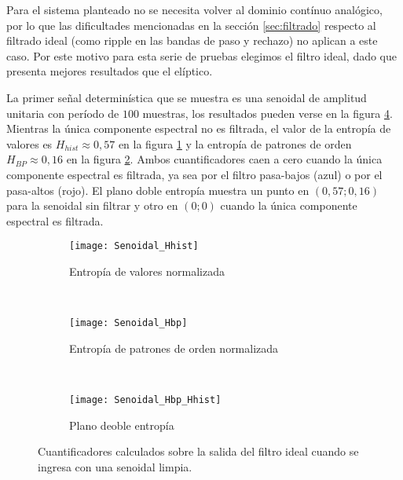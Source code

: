 Para el sistema planteado no se necesita volver al dominio contínuo analógico, por lo que las dificultades mencionadas en la sección \ref{sec:filtrado} respecto al filtrado ideal (como ripple en las bandas de paso y rechazo) no aplican a este caso.
Por este motivo para esta serie de pruebas elegimos el filtro ideal, dado que presenta mejores resultados que el elíptico.

La primer señal determinística que se muestra es una senoidal de amplitud unitaria con período de $100$ muestras, los resultados pueden verse en la figura \ref{fig:Senoidal}.
Mientras la única componente espectral no es filtrada, el valor de la entropía de valores es $H_{hist}\approx0,57$ en la figura \ref{subfig:Senoidal_Hhist} y la entropía de patrones de orden $H_{BP}\approx0,16$ en la figura \ref{subfig:Senoidal_Hbp}.
Ambos cuantificadores caen a cero cuando la única componente espectral es filtrada, ya sea por el filtro pasa-bajos (azul) o por el pasa-altos (rojo).
El plano doble entropía muestra un punto en $\left(0,57;0,16\right)$ para la senoidal sin filtrar y otro en $\left(0;0\right)$ cuando la única componente espectral es filtrada.

\begin{figure}[h]
    \centering
    \begin{subfigure}[t]{0.32\textwidth}
        \texttt{[image: Senoidal\_Hhist]}
        \caption{Entropía de valores normalizada}
        \label{subfig:Senoidal_Hhist}
    \end{subfigure}
    ~ %
    \begin{subfigure}[t]{0.32\textwidth}
        \texttt{[image: Senoidal\_Hbp]}
        \caption{Entropía de patrones de orden normalizada}
        \label{subfig:Senoidal_Hbp}
    \end{subfigure}
    ~ %
    \begin{subfigure}[t]{0.32\textwidth}
        \texttt{[image: Senoidal\_Hbp\_Hhist]}
        \caption{Plano deoble entropía}
        \label{subfig:Senoidal_HbpHhist}
    \end{subfigure}
    \caption{Cuantificadores calculados sobre la salida del filtro ideal cuando se ingresa con una senoidal limpia.}\label{fig:Senoidal}
\end{figure}

